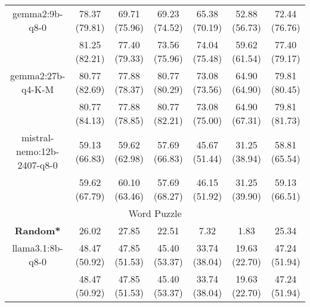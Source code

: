\begin{table}[]
{\begin{tabular}{ccccccc}
        \multicolumn{1}{c|}{gemma2:9b-q8-0} & 78.37 (79.81) & 69.71 (75.96) & \multicolumn{1}{c|}{69.23 (74.52)} & 65.38 (70.19) & \multicolumn{1}{c|}{52.88 (56.73)} & 72.44 (76.76) \\
        
        

        \multicolumn{1}{c|}{} & 81.25 (82.21) & 77.40 (79.33) & \multicolumn{1}{c|}{73.56 (75.96)} & 74.04 (75.48) & \multicolumn{1}{c|}{59.62 (61.54)} & 77.40 (79.17) \\
        \cline{1-7}
        

        \multicolumn{1}{c|}{gemma2:27b-q4-K-M} & 80.77 (82.69) & 77.88 (78.37) & \multicolumn{1}{c|}{80.77 (80.29)} & 73.08 (73.56) & \multicolumn{1}{c|}{64.90 (64.90)} & 79.81 (80.45) \\
        
        

        \multicolumn{1}{c|}{} & 80.77 (84.13) & 77.88 (78.85) & \multicolumn{1}{c|}{80.77 (82.21)} & 73.08 (75.00) & \multicolumn{1}{c|}{64.90 (67.31)} & 79.81 (81.73) \\
        \cline{1-7}
        

        \multicolumn{1}{c|}{mistral-nemo:12b-2407-q8-0} & 59.13 (66.83) & 59.62 (62.98) & \multicolumn{1}{c|}{57.69 (66.83)} & 45.67 (51.44) & \multicolumn{1}{c|}{31.25 (38.94)} & 58.81 (65.54) \\
        
        

        \multicolumn{1}{c|}{} & 59.62 (67.79) & 60.10 (63.46) & \multicolumn{1}{c|}{57.69 (68.27)} & 46.15 (51.92) & \multicolumn{1}{c|}{31.25 (39.90)} & 59.13 (66.51) \\
        \cline{1-7}
        
\hline
\multicolumn{7}{c}{Word Puzzle} \\ \hline
\multicolumn{1}{c|}{\textbf{Random*}} & 26.02 & 27.85 & \multicolumn{1}{c|}{22.51} & 7.32 & \multicolumn{1}{c|}{1.83} & 25.34 \\ \hline

        \multicolumn{1}{c|}{llama3.1:8b-q8-0} & 48.47 (50.92) & 47.85 (51.53) & \multicolumn{1}{c|}{45.40 (53.37)} & 33.74 (38.04) & \multicolumn{1}{c|}{19.63 (22.70)} & 47.24 (51.94) \\
        
        

        \multicolumn{1}{c|}{} & 48.47 (50.92) & 47.85 (51.53) & \multicolumn{1}{c|}{45.40 (53.37)} & 33.74 (38.04) & \multicolumn{1}{c|}{19.63 (22.70)} & 47.24 (51.94) \\
        \cline{1-7}
        


\end{tabular}}
\end{table}
